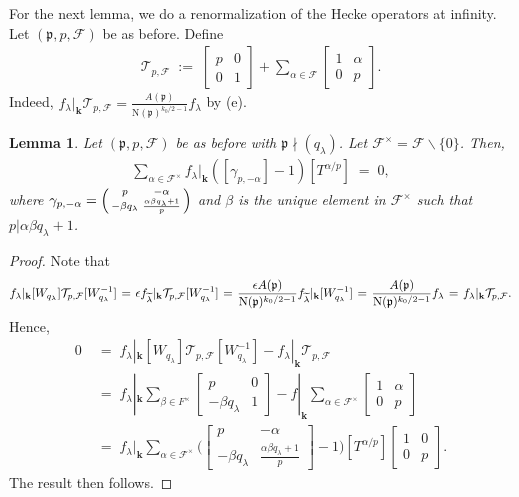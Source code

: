 \documentclass[11pt]{amsart}
\newtheorem{lemma}[theorem]{Lemma}
\theoremstyle{remark}
\newcommand\bm[1]{\begin{bmatrix}#1\end{bmatrix}}
\newcommand\sm[1]{\begin{psmallmatrix}#1\end{psmallmatrix}}
\newcommand\mbf[1]{\mathbf{#1}}
\newcommand\cl[1]{\mathcal{#1}}
\newcommand\fr[1]{\mathfrak{#1}}
\newcommand\wt[1]{\widetilde{#1}}
\newcommand{\bslash}{\backslash}
\newcommand{\eq}{\;=\;}
\newcommand{\deq}{\;:=\;}
\def\thin{{\hskip 1pt}}
\newcommand{\N}{\mathrm{N}}
\begin{document}
For the next lemma, we do a renormalization of the Hecke operators at infinity. Let $(\fr{p},p,\cl{F})$ be as before. Define
\begin{align*}
    \cl{T}_{p,\cl{F}}\deq\bm{p&0\\0&1}+\sum_{\alpha\in\cl{F}}\bm{1&\alpha\\0&p}.
\end{align*}
Indeed, $f_\lambda|_\mbf{k}\cl{T}_{p,\cl{F}}=\frac{A(\fr{p})}{\N(\fr{p})^{k_0/2-1}}f_\lambda$ by (e).

\begin{lemma}
\label{primesum}
Let $(\fr{p},p,\cl{F})$ be as before with $\fr{p}\nmid(q_\lambda)$. Let $\cl{F}^\times=\cl{F}\bslash\{0\}$. Then,
\begin{align*}
    \sum_{\alpha\in \cl{F}^\times}f_\lambda|_\mbf{k}([\gamma_{p,-\alpha}]-1)[T^{\alpha/p}]\eq 0,
\end{align*}
where $\gamma_{p,-\alpha}=\sm{p&-\alpha\\-\beta q_\lambda&\frac{\alpha\beta q_\lambda+1}{p}}$ and $\beta$ is the unique element in $\cl{F}^\times$ such that $p|\alpha\beta q_\lambda+1$.
\end{lemma}
\begin{proof}
Note that
\begin{align*}
    f_\lambda|_\mbf{k}[W_{q_\lambda}]\cl{T}_{p,\cl{F}}[W_{q_\lambda}^{-1}]\thin =\thin\epsilon f_{\wt{\lambda}}|_\mbf{k}\cl{T}_{p,\cl{F}}[W_{q_\lambda}^{-1}]\thin =\thin\frac{\epsilon A(\fr{p})}{\N(\fr{p})^{k_0/2-1}}f_{\wt{\lambda}}|_\mbf{k}[W_{q_\lambda}^{-1}]\thin =\thin\frac{A(\fr{p})}{\N(\fr{p})^{k_0/2-1}}f_\lambda\thin =\thin f_\lambda|_\mbf{k}\cl{T}_{p,\cl{F}}.
\end{align*}
Hence,
\begin{align*}
    0&\eq f_\lambda|_\mbf{k}[W_{q_\lambda}]\cl{T}_{p,\cl{F}}[W_{q_\lambda}^{-1}]-f_\lambda|_\mbf{k}\cl{T}_{p,\cl{F}} \\
    &\eq f_\lambda|_\mbf{k}\sum_{\beta\in F^\times}\bm{p&0\\-\beta q_\lambda&1}-f|_\mbf{k}\sum_{\alpha\in\cl{F}^\times}\bm{1&\alpha\\0&p} \\
    &\eq f_\lambda|_\mbf{k}\sum_{\alpha\in\cl{F}^\times}\bigg(\bm{p&-\alpha\\-\beta q_\lambda&\frac{\alpha\beta q_\lambda+1}{p}}-1\bigg)[T^{\alpha/p}]\bm{1&0\\0&p}.
\end{align*}
The result then follows.
\end{proof}
\end{document}
